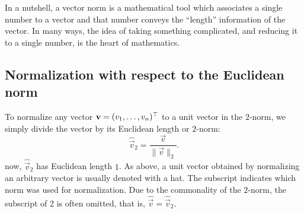 \documentclass{ximera}
\begin{document}
\hfill
{}
\hfill
{}

In a nutshell, a vector norm is a mathematical tool which associates a
single number to a vector and that number conveys the ``length''
information of the vector. In many ways, the idea of taking something
complicated, and reducing it to a single number, is the heart of
mathematics.

\subsection{Normalization with respect to the Euclidean norm}


To normalize any vector $\mathbf{v} = (v_1, \ldots, v_n)^\top$ to a unit
vector in the $2$-norm, we simply divide the vector by its Euclidean
length or $2$-norm:
\[
  \hat{\vec{v}}_2 = \frac{\vec{v}}{\|\vec{v}\|_2}.
\]
now, $\hat{\vec{v}}_2$ has Euclidean length $1$. As above, a unit
vector obtained by normalizing an arbitrary vector is usually denoted
with a hat. The subscript indicates which norm was used for
normalization. Due to the commonality of the $2$-norm, the subscript
of 2 is often omitted, that is, $\hat{\vec{v}} =
\hat{\vec{v}}_2$.
\end{document}
